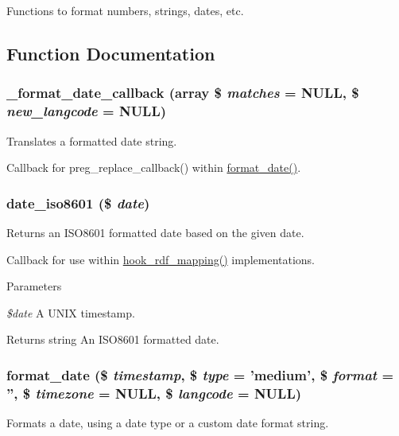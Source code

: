 Functions to format numbers, strings, dates, etc. 

\subsection{Function Documentation}
\hypertarget{group__format_gafbd5625a63c5da6e62dd6a53a314dfcd}{
\subsubsection[{\_\-format\_\-date\_\-callback}]{\setlength{\rightskip}{0pt plus 5cm}\_\-format\_\-date\_\-callback (array \$ {\em matches} = {\ttfamily NULL}, \/  \$ {\em new\_\-langcode} = {\ttfamily NULL})}}
\label{group__format_gafbd5625a63c5da6e62dd6a53a314dfcd}
Translates a formatted date string.

Callback for preg\_\-replace\_\-callback() within \hyperlink{group__format_ga40553742a67f9c79c4669b9053fe202c}{format\_\-date()}. \hypertarget{group__format_gabb13004721c9ab696704c968887d9d79}{
\subsubsection[{date\_\-iso8601}]{\setlength{\rightskip}{0pt plus 5cm}date\_\-iso8601 (\$ {\em date})}}
\label{group__format_gabb13004721c9ab696704c968887d9d79}
Returns an ISO8601 formatted date based on the given date.

Callback for use within \hyperlink{group__rdf_gae3e7f047bdcb9309b323e2af09966765}{hook\_\-rdf\_\-mapping()} implementations.


\begin{DoxyParams}{Parameters}
\item[{\em \$date}]A UNIX timestamp.\end{DoxyParams}
\begin{DoxyReturn}{Returns}
string An ISO8601 formatted date. 
\end{DoxyReturn}
\hypertarget{group__format_ga40553742a67f9c79c4669b9053fe202c}{
\subsubsection[{format\_\-date}]{\setlength{\rightskip}{0pt plus 5cm}format\_\-date (\$ {\em timestamp}, \/  \$ {\em type} = {\ttfamily 'medium'}, \/  \$ {\em format} = {\ttfamily ''}, \/  \$ {\em timezone} = {\ttfamily NULL}, \/  \$ {\em langcode} = {\ttfamily NULL})}}
\label{group__format_ga40553742a67f9c79c4669b9053fe202c}
Formats a date, using a date type or a custom date format string.


